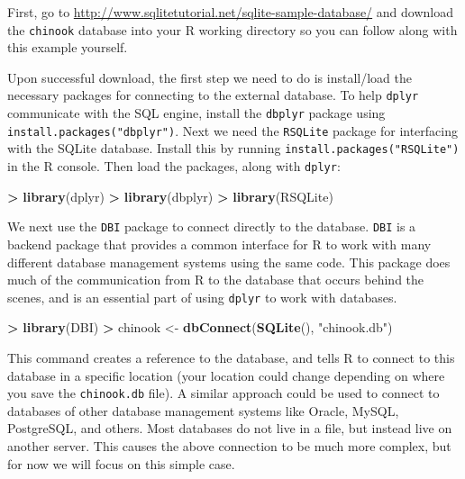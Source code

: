 \documentclass[]{krantz}
\makeatletter
\newenvironment{Shaded}{\begin{snugshade}}{\end{snugshade}}
\newcommand{\KeywordTok}[1]{\textcolor[rgb]{0.27,0.27,0.27}{\textbf{#1}}}
\newcommand{\StringTok}[1]{\textcolor[rgb]{0.5,0.5,0.5}{#1}}
\newcommand{\OperatorTok}[1]{\textcolor[rgb]{0.43,0.43,0.43}{\textbf{#1}}}
\newcommand{\NormalTok}[1]{#1}
\newenvironment{kframe}{%
\medskip{}
\setlength{\fboxsep}{.8em}
 \def\at@end@of@kframe{}%
 \ifinner\ifhmode%
  \def\at@end@of@kframe{\end{minipage}}%
  \begin{minipage}{\columnwidth}%
 \fi\fi%
 \def\FrameCommand##1{\hskip\@totalleftmargin \hskip-\fboxsep
 \colorbox{shadecolor}{##1}\hskip-\fboxsep
     \hskip-\linewidth \hskip-\@totalleftmargin \hskip\columnwidth}%
 \MakeFramed {\advance\hsize-\width
   \@totalleftmargin\z@ \linewidth\hsize
   \@setminipage}}%
 {\par\unskip\endMakeFramed%
 \at@end@of@kframe}
\renewenvironment{Shaded}{\begin{kframe}}{\end{kframe}}
\makeatother
\begin{document}
First, go to \url{http://www.sqlitetutorial.net/sqlite-sample-database/}
and download the \texttt{chinook} database into your R working directory
so you can follow along with this example yourself.

Upon successful download, the first step we need to do is install/load
the necessary packages for connecting to the external database. To help
\texttt{dplyr} communicate with the SQL engine, install the
\texttt{dbplyr} package using \texttt{install.packages("dbplyr")}. Next
we need the \texttt{RSQLite} package for interfacing with the SQLite
database. Install this by running \texttt{install.packages("RSQLite")}
in the R console. Then load the packages, along with \texttt{dplyr}:

\begin{Shaded}
\begin{Highlighting}[]
\OperatorTok{>}\StringTok{ }\KeywordTok{library}\NormalTok{(dplyr)}
\OperatorTok{>}\StringTok{ }\KeywordTok{library}\NormalTok{(dbplyr)}
\OperatorTok{>}\StringTok{ }\KeywordTok{library}\NormalTok{(RSQLite)}
\end{Highlighting}
\end{Shaded}

We next use the \texttt{DBI} package to connect directly to the
database. \texttt{DBI} is a backend package that provides a common
interface for R to work with many different database management systems
using the same code. This package does much of the communication from R
to the database that occurs behind the scenes, and is an essential part
of using \texttt{dplyr} to work with databases.

\begin{Shaded}
\begin{Highlighting}[]
\OperatorTok{>}\StringTok{ }\KeywordTok{library}\NormalTok{(DBI)}
\OperatorTok{>}\StringTok{ }\NormalTok{chinook <-}\StringTok{ }\KeywordTok{dbConnect}\NormalTok{(}\KeywordTok{SQLite}\NormalTok{(), }\StringTok{"chinook.db"}\NormalTok{)}
\end{Highlighting}
\end{Shaded}

This command creates a reference to the database, and tells R to connect
to this database in a specific location (your location could change
depending on where you save the \texttt{chinook.db} file). A similar
approach could be used to connect to databases of other database
management systems like Oracle, MySQL, PostgreSQL, and others. Most
databases do not live in a file, but instead live on another server.
This causes the above connection to be much more complex, but for now we
will focus on this simple case.
\end{document}
